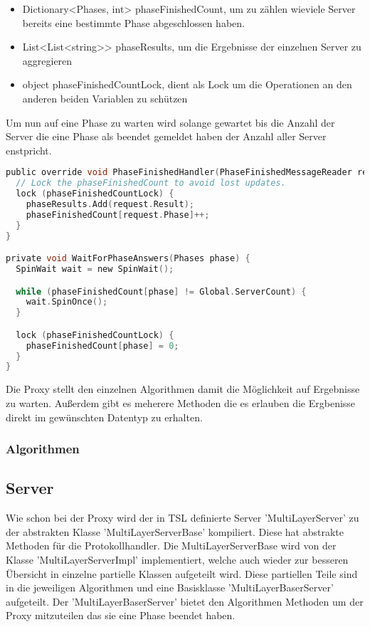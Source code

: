 \begin{itemize}
  \item Dictionary<Phases, int> phaseFinishedCount, um zu zählen wieviele Server bereits eine bestimmte Phase abgeschlossen haben.
  \item List<List<string>> phaseResults, um die Ergebnisse der einzelnen Server zu aggregieren
  \item object phaseFinishedCountLock, dient als Lock um die Operationen an den anderen beiden Variablen zu schützen
\end{itemize}


Um nun auf eine Phase zu warten wird solange gewartet bis die Anzahl der Server die eine Phase als beendet gemeldet haben der Anzahl aller Server enstpricht.

\begin{lstlisting}[language=c]
public override void PhaseFinishedHandler(PhaseFinishedMessageReader request) {
  // Lock the phaseFinishedCount to avoid lost updates.
  lock (phaseFinishedCountLock) {
    phaseResults.Add(request.Result);
    phaseFinishedCount[request.Phase]++;
  }
}

private void WaitForPhaseAnswers(Phases phase) {
  SpinWait wait = new SpinWait();

  while (phaseFinishedCount[phase] != Global.ServerCount) {
    wait.SpinOnce();
  }

  lock (phaseFinishedCountLock) {
    phaseFinishedCount[phase] = 0;
  }
}
\end{lstlisting}

Die Proxy stellt den einzelnen Algorithmen damit die Möglichkeit auf Ergebnisse zu warten. Außerdem gibt es meherere Methoden die es erlauben die Ergbenisse direkt im gewünschten Datentyp zu erhalten.

\subsubsection{Algorithmen}



\subsection{Server}

Wie schon bei der Proxy wird der in TSL definierte Server 'MultiLayerServer' zu der abstrakten Klasse 'MultiLayerServerBase' kompiliert. Diese hat abstrakte Methoden für die Protokollhandler.
Die MultiLayerServerBase wird von der Klasse 'MultiLayerServerImpl' implementiert, welche auch wieder zur besseren Übersicht in einzelne partielle Klassen aufgeteilt wird. Diese partiellen Teile sind in die jeweiligen Algorithmen und eine Basisklasse 'MultiLayerBaserServer' aufgeteilt.
Der 'MultiLayerBaserServer' bietet den Algorithmen Methoden um der Proxy mitzuteilen das sie eine Phase beendet haben.


